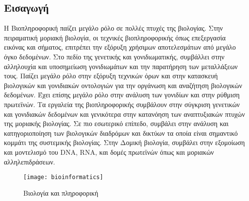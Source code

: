 \subsection{Εισαγωγή}
Η Βιοπληροφορική παίζει μεγάλο ρόλο σε πολλές πτυχές της βιολογίας. Στην πειραματική μοριακή βιολογία, οι τεχνικές βιοπληροφορικής όπως επεξεργασία εικόνας και σήματος, επιτρέπει την εξόρυξη χρήσιμων αποτελεσμάτων από μεγάλο όγκο δεδομένων. Στο πεδίο της γενετικής και γονιδιωματικής, συμβάλλει στην αλληλουχία και υποσημείωση γονιδιωμάτων και την παρατήρηση των μεταλλάξεων τους. Παίζει μεγάλο ρόλο στην εξόρυξη τεχνικών όρων και στην κατασκευή βιολογικών και γονιδιακών οντολογιών για την οργάνωση και αναζήτηση βιολογικών δεδομένων. Έχει επίσης μεγάλο ρόλο στην ανάλυση των γονιδίων και στην ρύθμιση πρωτεϊνών. Τα εργαλεία της βιοπληροφορικής συμβάλουν στην σύγκριση γενετικών και γονιδιακών δεδομένων και γενικότερα στην κατανόηση των αναπτυξιακών πτυχών της μοριακής βιολογίας. Σε πιο εσωτερικό επίπεδο, συμβάλει στην ανάλυση και κατηγοριοποίηση των βιολογικών διαδρόμων και δικτύων τα οποία είναι σημαντικό κομμάτι της συστεμικής βιολογίας. Στην Δομική βιολογία, συμβάλει στην εξομοίωση και μοντελισμό του DNA, RNA, και δομές πρωτεϊνών όπως και μοριακών αλληλεπιδράσεων.
\begin{figure}[h]
\centering
\texttt{[image: bioinformatics]}
\caption{Βιολογία και πληροφορική}
\end{figure}